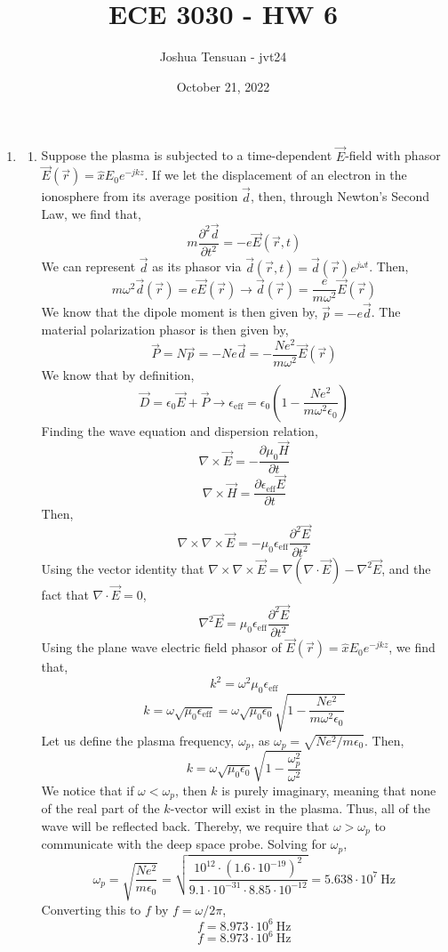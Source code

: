 \documentclass[12pt]{article}
\begin{document}
\usetikzlibrary{scopes}
\def\iangle{35} %

\def\down{-90}
\def\arcr{0.5cm} %

\title{ECE 3030 - HW 6}
\author{Joshua Tensuan - jvt24}
\date{October 21, 2022}
\maketitle


\begin{enumerate}
	\item [6.1]
	\begin{enumerate}
		\item [Pt 1.]
		Suppose the plasma is subjected to a time-dependent $\vec E$-field with phasor $\vec E(\vec r)=\hat x E_0e^{-jkz}$.
		If we let the displacement of an electron in the ionosphere from its average position $\vec d$, then, through Newton's Second Law, we find that,
		\[m\frac{\partial^2 \vec d}{\partial t^2}=-e\vec E(\vec r, t)\]
		We can represent $\vec d$ as its phasor via $\vec d(\vec r, t)=\vec d(\vec r)e^{j\omega t}$.
		Then,
		\[m\omega^2\vec d(\vec r)=e\vec E(\vec r)\to \vec d(\vec r)=\frac{e}{m\omega^2}\vec E(\vec r)\]
		We know that the dipole moment is then given by, $\vec p=-e\vec d$.
		The material polarization phasor is then given by,
		\[\vec P=N\vec p = -Ne\vec d = -\frac{Ne^2}{m\omega^2}\vec E(\vec r)\]
		We know that by definition,
		\[\vec D= \epsilon_0 \vec E + \vec P \to \epsilon_{\mathrm{eff}}=\epsilon_0\left(1-\frac{Ne^2}{m\omega^2\epsilon_0}\right)\]
		Finding the wave equation and dispersion relation,
		\[\nabla\times \vec E= -\frac{\partial \mu_0 \vec H}{\partial t}\]
		\[\nabla \times \vec H = \frac{\partial \epsilon_{\mathrm{eff}}\vec E}{\partial t}\]
		Then,
		\[\nabla \times \nabla\times  \vec E =-\mu_0\epsilon_{\mathrm{eff}}\frac{\partial^2 \vec E}{\partial t^2}\]
		Using the vector identity that $\nabla \times \nabla \times \vec E = \nabla(\nabla \cdot \vec E)-\nabla^2 \vec E$, and the fact that $\nabla \cdot \vec E=0$,
		\[\nabla^2\vec E = \mu_0\epsilon_{\mathrm{eff}}\frac{\partial^2 \vec E}{\partial t^2}\]
		Using the plane wave electric field phasor of $\vec E(\vec r)=\hat x E_0e^{-jkz}$, we find that,
		\[k^2=\omega^2 \mu_0\epsilon_{\mathrm{eff}}\]
		\[k = \omega \sqrt{\mu_0\epsilon_{\mathrm{eff}}}=\omega\sqrt{\mu_0\epsilon_0}\sqrt{1-\frac{Ne^2}{m\omega^2\epsilon_0}}\]
		Let us define the plasma frequency, $\omega_p$, as $\omega_p=\sqrt{Ne^2/m\epsilon_0}$.
		Then,
		\[k=\omega\sqrt{\mu_0\epsilon_0}\sqrt{1-\frac{\omega_p^2}{\omega^2}}\]
		We notice that if $\omega<\omega_p$, then $k$ is purely imaginary, meaning that none of the real part of the $k$-vector will exist in the plasma.
		Thus, all of the wave will be reflected back.
		Thereby, we require that $\omega>\omega_p$ to communicate with the deep space probe.
		Solving for $\omega_p$,
		\[\omega_p = \sqrt{\frac{Ne^2}{m\epsilon_0}}=\sqrt{\frac{10^{12}\cdot (1.6 \cdot 10^{-19})^2}{9.1\cdot 10^{-31}\cdot 8.85\cdot 10^{-12}}}=5.638\cdot 10^{7}\: \mathrm{Hz}\]
		Converting this to $f$ by $f=\omega/2\pi$,
		\[f=8.973 \cdot 10^6 \: \mathrm{Hz}\]
		\[\boxed{f=8.973 \cdot 10^6 \: \mathrm{Hz}}\]



\end{enumerate}
\end{enumerate}
\end{document}
